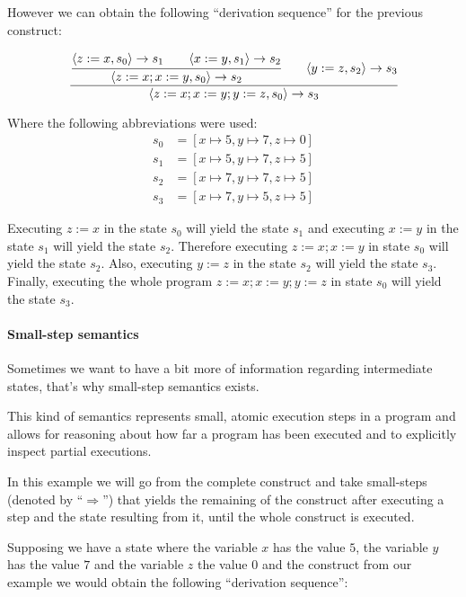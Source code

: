 However we can obtain the following \enquote{derivation sequence} for the previous construct:

\begin{equation*}
\cfrac{
  \cfrac{\langle z:=x, s_{0}\rangle \rightarrow s_{1} \qquad \langle x:=y, s_{1} \rangle \rightarrow s_{2}}
    {\langle z:=x; x:=y, s_{0} \rangle \rightarrow s_{2}}
  \qquad
  \langle y:=z, s_{2} \rangle \rightarrow s_{3}
  }
  {\langle z:=x; x:=y; y:=z, s_{0} \rangle \rightarrow s_{3}}
\end{equation*}

Where the following abbreviations were used:
\begin{align*}
s_{0} &= [x\mapsto5, y\mapsto7, z\mapsto0]\\
s_{1} &= [x\mapsto5, y\mapsto7, z\mapsto5]\\
s_{2} &= [x\mapsto7, y\mapsto7, z\mapsto5]\\
s_{3} &= [x\mapsto7, y\mapsto5, z\mapsto5]
\end{align*}

Executing $z:=x$ in the state $s_{0}$ will yield the state $s_{1}$ and executing $x:=y$ in the state $s_{1}$ will yield the state $s_{2}$.
Therefore executing $z:=x; x:=y$ in state $s_{0}$ will yield the state $s_{2}$.
Also, executing $y:=z$ in the state $s_{2}$ will yield the state $s_{3}$.
Finally, executing the whole program $z:=x; x:=y; y:=z$ in state $s_{0}$ will yield the state $s_{3}$.

\paragraph{Small-step semantics}

Sometimes we want to have a bit more of information regarding intermediate states, that's why small-step semantics exists.

This kind of semantics represents small, atomic execution steps in a program and allows for reasoning about how far a program has been executed and to explicitly inspect partial executions.~\parencite{nipkow}

In this example we will go from the complete construct and take small-steps (denoted by ``$\Rightarrow$'') that yields the remaining of the construct after executing a step and the state resulting from it, until the whole construct is executed.

Supposing we have a state where the variable $x$ has the value $5$, the variable $y$ has the value $7$ and the variable $z$ the value $0$ and the construct from our example we would obtain the following \enquote{derivation sequence}:

